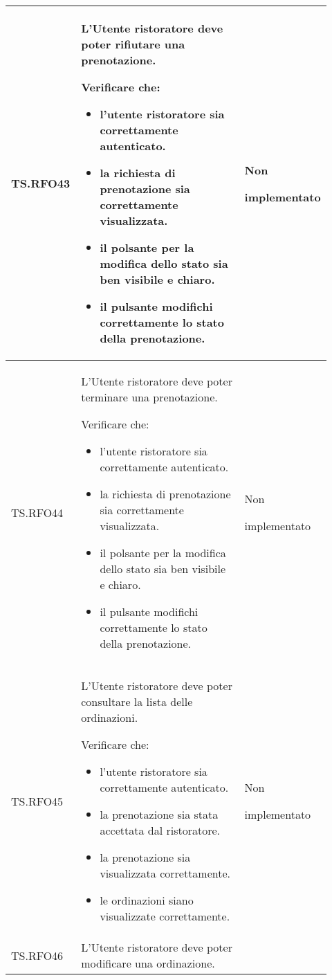 \begin{longtable}{|p{0.10\linewidth}|p{0.70\linewidth}|p{0.12\linewidth}|}
    TS.RFO43 & 
    L’Utente ristoratore deve poter rifiutare una prenotazione. \par 
    Verificare che: 
    \begin{itemize}
        \item l'utente ristoratore sia correttamente autenticato.
        \item la richiesta di prenotazione sia correttamente visualizzata.
        \item il polsante per la modifica dello stato sia ben visibile e chiaro.
        \item il pulsante modifichi correttamente lo stato della prenotazione.
    \end{itemize}&
    Non \par implementato  \\
    \hline
    TS.RFO44 & 
    L’Utente ristoratore deve poter terminare una prenotazione. \par 
    Verificare che: 
    \begin{itemize}
        \item l'utente ristoratore sia correttamente autenticato.
        \item la richiesta di prenotazione sia correttamente visualizzata.
        \item il polsante per la modifica dello stato sia ben visibile e chiaro.
        \item il pulsante modifichi correttamente lo stato della prenotazione.
    \end{itemize}&
    Non \par implementato  \\
    \hline
    TS.RFO45 & 
    L’Utente ristoratore deve poter consultare la lista delle ordinazioni. \par 
    Verificare che: 
    \begin{itemize}
        \item l'utente ristoratore sia correttamente autenticato.
        \item la prenotazione sia stata accettata dal ristoratore.
        \item la prenotazione sia visualizzata correttamente.
        \item le ordinazioni siano visualizzate correttamente.
    \end{itemize}&
    Non \par implementato  \\
    \hline
    TS.RFO46 & 
    L’Utente ristoratore deve poter modificare una ordinazione. \par 

\end{longtable}
